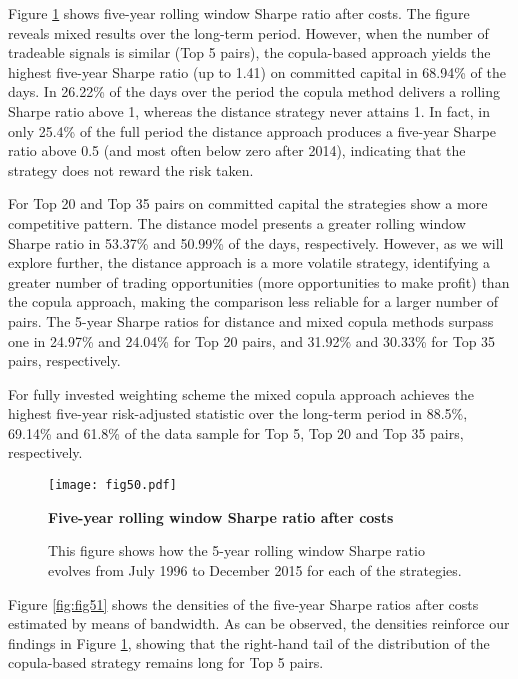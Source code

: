 \documentclass[a4paper]{article}
\begin{document}
Figure \ref{fig:fig50} shows five-year rolling window Sharpe ratio after costs. The figure reveals mixed results over the long-term period. However, when the number of tradeable signals is similar (Top 5 pairs), the copula-based approach yields the highest five-year Sharpe ratio (up to 1.41) on committed capital in 68.94\% of the days. In 26.22\% of the days over the period the copula method delivers a rolling Sharpe ratio above 1, whereas the distance strategy never attains 1. In fact, in only 25.4\% of the full period the distance approach produces a five-year Sharpe ratio above 0.5 (and most often below zero after 2014), indicating that the strategy does not reward the risk taken.

For Top 20 and Top 35 pairs on committed capital the strategies show a more competitive pattern. The distance model presents a greater rolling window Sharpe ratio in 53.37\% and 50.99\% of the days, respectively. However, as we will explore further, the distance approach is a more volatile strategy, identifying a greater number of trading opportunities (more opportunities to make profit) than the copula approach, making the comparison less reliable for a larger number of pairs. The 5-year Sharpe ratios for distance and mixed copula methods surpass one in 24.97\% and 24.04\% for Top 20 pairs, and 31.92\% and 30.33\% for Top 35 pairs, respectively.

For fully invested weighting scheme the mixed copula approach achieves the highest five-year risk-adjusted statistic over the long-term period in 88.5\%, 69.14\% and 61.8\% of the data sample for Top 5, Top 20 and Top 35 pairs, respectively.


\begin{figure}[H]
\centering
\texttt{[image: fig50.pdf]}
\caption{\textbf{Five-year rolling window Sharpe ratio after costs}}
\caption*{\scriptsize This figure shows how the 5-year rolling window Sharpe ratio evolves from July 1996 to December 2015 for each of the strategies.}
\label{fig:fig50}
\end{figure}

\vspace{0.6cm}

Figure \ref{fig:fig51} shows the densities of the five-year Sharpe ratios after costs estimated by means of \citet*{sj1991} bandwidth. As can be observed, the densities reinforce our findings in Figure \ref{fig:fig50}, showing that the right-hand tail of the distribution of the copula-based strategy remains long for Top 5 pairs.
\end{document}
